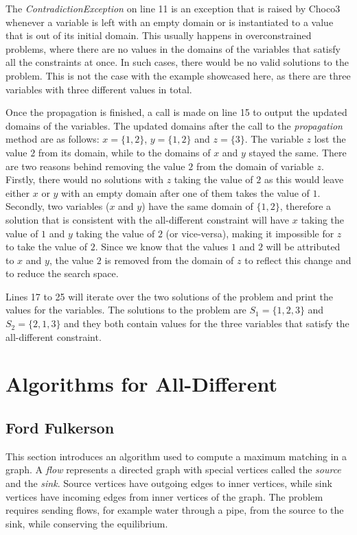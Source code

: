 \documentclass{l4proj}
\begin{document}
\noindent The \textit{ContradictionException} on line 11 is an exception that is raised by Choco3 whenever a variable is left with an empty domain or is instantiated to a value that is out of its initial domain. This usually happens in overconstrained problems, where there are no values in the domains of the variables that satisfy all the constraints at once. In such cases, there would be no valid solutions to the problem. This is not the case with the example showcased here, as there are three variables with three different values in total.

\noindent Once the propagation is finished, a call is made on line 15 to output the updated domains of the variables. The updated domains after the call to the \textit{propagation} method are as follows: $x = \{1, 2\}$, $y = \{1, 2\}$ and $z = \{3\}$. The variable $z$ lost the value $2$ from its domain, while to the domains of $x$ and $y$ stayed the same. There are two reasons behind removing the value $2$ from the domain of variable $z$. Firstly, there would no solutions with $z$ taking the value of $2$ as this would leave either $x$ or $y$ with an empty domain after one of them takes the value of $1$. Secondly, two variables ($x$ and $y$) have the same domain of $\{1, 2\}$, therefore a solution that is consistent with the all-different constraint will have $x$ taking the value of $1$ and $y$ taking the value of $2$ (or vice-versa), making it impossible for $z$ to take the value of $2$.  Since we know that the values $1$ and $2$ will be attributed to $x$ and $y$, the value $2$ is removed from the domain of $z$ to reflect this change and to reduce the search space.

\noindent Lines 17 to 25 will iterate over the two solutions of the problem and print the values for the variables. The solutions to the problem are $S_1 = \{1, 2, 3\}$ and $S_2 = \{2, 1, 3\}$ and they both contain values for the three variables that satisfy the all-different constraint.

\chapter{Algorithms for All-Different}
\label{chap4alldiffalgos}

\section{Ford Fulkerson}
\label{ffsection}
\noindent This section introduces an algorithm used to compute a maximum matching in a graph. A \textit{flow} represents a directed graph with special vertices called the \textit{source} and the \textit{sink}. Source vertices have outgoing edges to inner vertices, while sink vertices have incoming edges from inner vertices of the graph. The problem requires sending flows, for example water through a pipe, from the source to the sink, while conserving the equilibrium.
\end{document}
